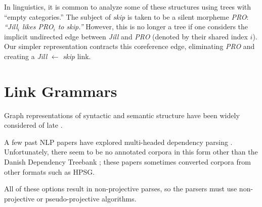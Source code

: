 \documentclass[11pt]{article}
\newcommand{\Note}[4][]{\todo[author=#2,color=#3,fancyline,#1]{#4}}
\newcommand{\noteJE}[2][]{\Note[#1]{JE}{green!40}{#2}}
\newcommand{\NoteJE}[2][]{\noteJE[inline,#1]{#2}}
\begin{document}
In linguistics, it is common to analyze some of these structures using trees with ``empty categories.''  The subject of {\em skip} is taken to be a silent morpheme {\em PRO}:
{\em ``Jill$_i$ likes PRO$_i$ to skip.''}  However, this is no longer a tree if one considers the implicit undirected edge between {\em Jill} and {\em PRO} (denoted by their shared index $i$).  Our simpler representation contracts this coreference edge, eliminating {\em PRO} and creating a {\em Jill} $\leftarrow$ {\em skip} link.  

\section{Link Grammars}

Graph representations of syntactic and semantic structure have been widely considered of late \cite{demarneffe-manning-2008,ivanova-et-al-2012,AMR-2013,oepen-et-al-2014}.

A few past NLP papers have explored multi-headed dependency parsing \cite{buchkromann-2006,mcdonald-pereira-2006,sagae-tsujii-2008,gomezrodriguez-nivre-2013}.  Unfortunately, there seem to be no annotated corpora in this form other than the Danish Dependency Treebank \cite{kromann-2003}; these papers  sometimes converted corpora from other formats such as HPSG.


All of these options result in non-projective parses, so the parsers must use non-projective or pseudo-projective algorithms.
\end{document}
